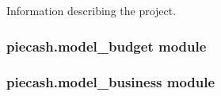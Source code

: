 \documentclass[letterpaper,10pt,english]{sphinxmanual}
\begin{document}
Information describing the project.


\subsubsection{piecash.model\_budget module}
\label{api/piecash.model_budget:piecash-model-budget-module}\label{api/piecash.model_budget::doc}\label{api/piecash.model_budget:module-piecash.model_budget}

\subsubsection{piecash.model\_business module}
\label{api/piecash.model_business::doc}\label{api/piecash.model_business:piecash-model-business-module}\label{api/piecash.model_business:module-piecash.model_business}
\end{document}
